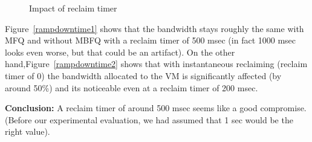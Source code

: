 \begin{figure}[h]
\centering
{}
\vspace{-1em}
\caption{Impact of reclaim timer}
\vspace{-1em}
\label{fig:reclaim}
\end{figure}

Figure~\ref{rampdowntime1} shows that the bandwidth stays roughly the same with
MFQ and without MBFQ with a reclaim timer of 500 msec (in fact 1000 msec looks
even worse, but that could be an artifact).   On the other
hand,Figure~\ref{rampdowntime2} shows that with instantaneous reclaiming
(reclaim timer of 0) the bandwidth allocated to the VM is significantly affected
(by around 50\%) and its noticeable even at a reclaim timer of 200 msec.

{\bf Conclusion:}  A reclaim timer of around 500 msec seems like a good
compromise.  (Before our experimental evaluation, we had assumed that 1 sec
would be the right value). 
